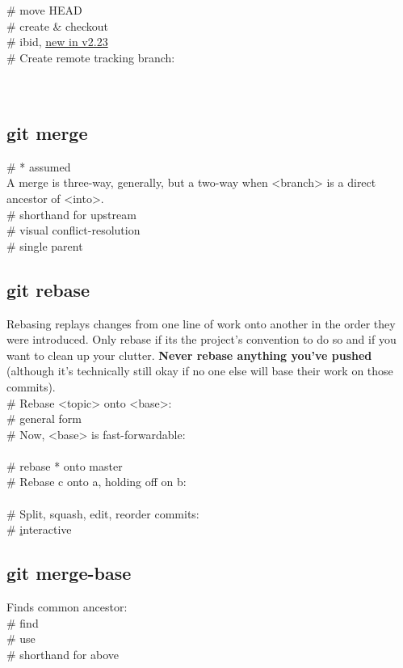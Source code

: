  \# move HEAD \\
 \# create \& checkout \\
 \# ibid, \href{https://stackoverflow.com/questions/3965676/why-did-my-git-repo-enter-a-detached-head-state}{new in v2.23}\\
\# Create remote tracking branch:\\
 \\
 \\



\subsection*{git merge}
 \# * assumed \\
A merge is three-way, generally, but a two-way  when <branch> is a direct ancestor of <into>.\\ 
 \# shorthand for upstream \\
 \# visual conflict-resolution \\
 \# single parent \\ 



\subsection*{git rebase}
{\footnotesize 
Rebasing replays changes from one line of work onto another in the order they were introduced.  
Only rebase if it\textquotesingle s the project's convention to do so and if you want to clean up your clutter. \textbf{Never rebase anything you've pushed} (although it's technically still okay if no one else will base their work on those commits).}\\
\# Rebase <topic> onto <base>:\\ 
 \# general form \\
\# Now, <base> is fast-forwardable:\\
\\
 \# rebase * onto master\\
\# Rebase c onto a, holding off on b: \\
 \\
\# Split, squash, edit, reorder commits: \\
 \# \underline{i}nteractive \\


\subsection*{git merge-base}
Finds common ancestor:\\
 \# find \\
 \# use \\
 \# shorthand for above \\

